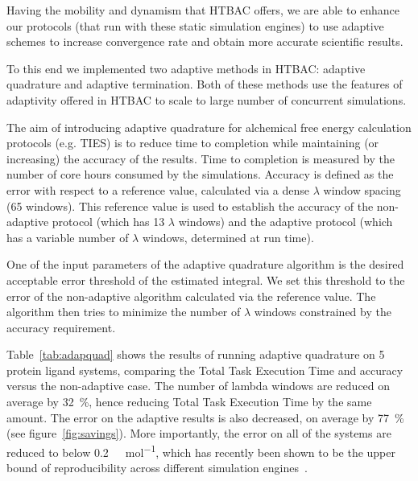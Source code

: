 Having the mobility and dynamism that HTBAC offers, we are able to enhance our
protocols (that run with these static simulation engines) to use adaptive
schemes to increase convergence rate and obtain more accurate scientific
results.

To this end we implemented two adaptive methods in HTBAC: adaptive quadrature
and adaptive termination. Both of these methods use the features of adaptivity
offered in HTBAC to scale to large number of concurrent simulations.



The aim of introducing adaptive quadrature for alchemical free energy
calculation protocols (e.g. TIES) is to reduce time to completion while
maintaining (or increasing) the accuracy of the results. Time to completion is
measured by the number of core hours consumed by the simulations. Accuracy is
defined as the error with respect to a reference value, calculated via a dense
$\lambda$ window spacing (65 windows). This reference value is used to
establish the accuracy of the non-adaptive protocol (which has 13 $\lambda$
windows) and the adaptive protocol (which has a variable number of $\lambda$
windows, determined at run time).

One of the input parameters of the adaptive quadrature algorithm is the
desired acceptable error threshold of the estimated integral. We set this
threshold to the error of the non-adaptive algorithm calculated via the
reference value. The algorithm then tries to minimize the number of $\lambda$
windows constrained by the accuracy requirement.

Table~\ref{tab:adapquad} shows the results of running adaptive quadrature on 5
protein ligand systems, comparing the Total Task Execution Time and accuracy
versus the non-adaptive case. The number of lambda windows are reduced on
average by \SI{32}{\percent}, hence reducing Total Task Execution Time by the
same amount. The error on the adaptive results is also decreased, on average by
\SI{77}{\percent} (see figure~\ref{fig:savings}). More importantly, the error on
all of the systems are reduced to below \SI{0.2}{\kilo\calorie\per\mole}, which
has recently been shown to be the upper bound of reproducibility across
different simulation engines~\cite{Loeffler2018}.

